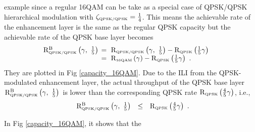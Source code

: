 \documentclass[10pt,fleqn, twocolumn]{IEEEtran}
\begin{document}
example since a regular 16QAM can be take as a special case of
QPSK/QPSK hierarchical modulation with $\zeta_{\mbox{\tiny
QPSK/QPSK}}=\frac{1}{4}$. This means the achievable rate of the
enhancement layer is the same as the regular QPSK capacity but the
achievable rate of the QPSK base layer becomes
\begin{equation}\hspace{-0.2in}
\begin{array}{rl}
{\rm R}_{\mbox{\tiny QPSK/QPSK}}^{\rm B}\left(\gamma,\
\frac{1}{5}\right)&\hspace{-0.08in}=\ {\rm R}_{\mbox{\tiny
QPSK/QPSK}}\left(\gamma,\
\frac{1}{5}\right)-{\rm R}_{\mbox{\tiny QPSK}} \left(\frac{1}{5}\gamma\right)\\
&\hspace{-0.08in}=\ {\rm R}_{\mbox{\tiny
16QAM}}\left(\gamma\right)-{\rm R}_{\mbox{\tiny
QPSK}}\left(\frac{1}{5}\gamma\right)\ .
\end{array}\label{R_16QAM_B1}
\end{equation}
\noindent They are plotted in Fig \ref{capacity_16QAM}. Due to the
ILI from the QPSK-modulated enhancement layer, the actual
throughput of the QPSK base layer ${\rm R}_{\mbox{\tiny
QPSK/QPSK}}^{\rm B}\left(\gamma,\ \frac{1}{5} \right)$ is lower
than the corresponding QPSK rate ${\rm R}_{\mbox{\tiny
QPSK}}\left(\frac{4}{5}\gamma\right)$, i.e.,
\begin{equation}
\begin{array}{rcl}
{\rm R}_{\mbox{\tiny QPSK/QPSK}}^{\rm B}\left(\gamma,\ \frac{1}{5}
\right)&\leq&{\rm R}_{\mbox{\tiny QPSK}}
\left(\frac{4}{5}\gamma\right)
\end{array}.\label{R_16QAM_B2}
\end{equation}
\begin{figure}
\end{figure}
\noindent In Fig \ref{capacity_16QAM}, it shows that the
\end{document}
